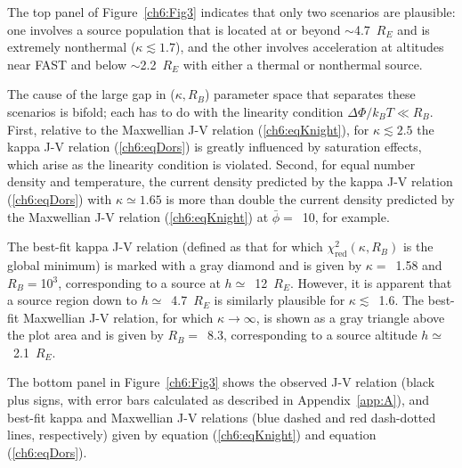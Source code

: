   The top panel of Figure~\ref{ch6:Fig3} indicates that only two scenarios are
  plausible: one involves a source population that is located at or beyond
  $\sim$4.7~$R_E$ and is extremely nonthermal ($\kappa \lesssim 1.7$), and the
  other involves acceleration at altitudes near FAST and below $\sim$2.2~$R_E$
  with either a thermal or nonthermal source.

  The cause of the large gap in ($\kappa, R_B$) parameter space that separates
  these scenarios is bifold; each has to do with the linearity condition
  $\Delta \Phi / k_B T \ll R_B $. First, relative to the Maxwellian J-V relation
  (\ref{ch6:eqKnight}), for $\kappa \lesssim 2.5$ the kappa J-V relation
  (\ref{ch6:eqDors}) is greatly influenced by saturation effects, which arise as
  the linearity condition is violated. Second, for equal number density and
  temperature, the current density predicted by the kappa J-V relation
  (\ref{ch6:eqDors}) with $\kappa \simeq 1.65$ is more than double the current
  density predicted by the Maxwellian J-V relation (\ref{ch6:eqKnight}) at
  $\bar{\phi} =$~10, for example.

  The best-fit kappa J-V relation (defined as that for which
  $\chi^2_{\textrm{red}} ( \kappa, R_B )$ is the global minimum) is marked with
  a gray diamond and is given by $\kappa =$~1.58 and $R_B =$10$^3$,
  corresponding to a source at $h \simeq$~12~$R_E$. However, it is apparent that
  a source region down to $h \simeq$~4.7~$R_E$ is similarly plausible for
  $\kappa \lesssim$~1.6. The best-fit Maxwellian J-V relation, for which
  $\kappa \rightarrow \infty$, is shown as a gray triangle above the plot area
  and is given by $R_B =$~8.3, corresponding to a source altitude
  $h \simeq$~2.1~$R_E$.

  The bottom panel in Figure~\ref{ch6:Fig3} shows the observed J-V relation
  (black plus signs, with error bars calculated as described in
  Appendix~\ref{app:A}), and best-fit kappa and Maxwellian J-V relations (blue
  dashed and red dash-dotted lines, respectively) given by equation
  (\ref{ch6:eqKnight}) and equation (\ref{ch6:eqDors}).

